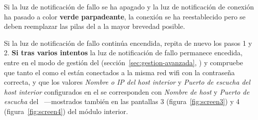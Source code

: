 \begin{enumeratecompact}
\begin{itemizecompact}
\item Si la luz de notificación de fallo  se ha apagado y la luz de notificación de conexión  ha pasado a color \textbf{verde parpadeante}, la conexión se ha reestablecido pero se deben reemplazar las pilas del \ME a la mayor brevedad posible.

\item Si la luz de notificación de fallo  continúa encendida, repita de nuevo los pasos 1 y 2. \textbf{\color{main}Si tras varios intentos} la luz de notificación de fallo  permanece encedida, entre en el modo de gestión del \ME (sección~\ref{sec:gestion-avanzada}, ) y compruebe que tanto el \MI como el \ME están conectados a la misma red wifi con la contraseña correcta, y que los valores \emph{Nombre o IP del host interior} y \emph{Puerto de escucha del host interior} configurados en el \ME se corresponden con \emph{Nombre de host} y \emph{Puerto de escucha} del \MI~---mostrados también en las pantallas 3 (figura~\ref{fig:screen3}) y 4 (figura~\ref{fig:screen4}) del módulo interior.

\end{itemizecompact}

\end{enumeratecompact}
